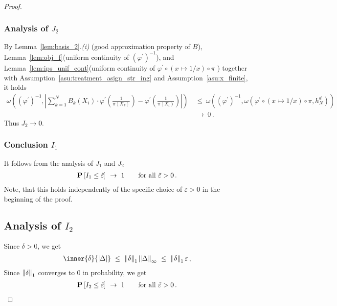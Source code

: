 \begin{proof}
\subsubsection*{Analysis of $J_2$}
By Lemma~\ref{lem:basis_2}.\textit{(i)}
(good approximation property of $B$),
Lemma~\ref{lem:obj_f}(uniform continuity of $(\varphi^{'})^{-1}$),
and
Lemma~\ref{lem:ips_unif_cont}(uniform continuity of 
$
\varphi^{'}\circ(x\mapsto1/x)\circ \pi
$
) 
together with 
Assumption~\eqref{asu:treatment_asign_str_ing} and Assumption~\ref{asu:x_finite},
it holds
\begin{align*}
\omega
\left(
  (
  \varphi^{'}
  )
  ^{-1}
  ,
  \left|
    \sum_{k=1}^{N}
  B_k(X_i)
  \cdot
  \varphi^{'}
  \left(
    \frac
    {1}
    {\pi(X_k)}
  \right)
  -
  \varphi^{'}
  \left(
    \frac
    {1}
    {\pi(X_i)}
  \right)
  \right|
  \right)
  &
  \ 
  \le
  \ 
\omega
\left(
  (
  \varphi^{'}
  )
  ^{-1}
  ,
\omega
\left(
\varphi^{'}\circ(x\mapsto1/x)\circ \pi
  ,
  h_N^d
  \right)
  \right)
  \\
  &
  \ 
  \to
  \ 
  0
  \,.
\end{align*}
Thus $J_2\to 0$.
\subsubsection*{Conclusion $I_1$}
It follows from the analysis of $J_1$ and $J_2$
\begin{align*}
  \P
  \left[
  I_1 \le \tilde{\varepsilon}
  \right]
  \ 
  \to
  \ 
  1
  \qquad
  \text{for all}\ 
  \tilde{\varepsilon}>0
  \,.
\end{align*}
Note, that this holds independently of the specific choice of $\varepsilon>0$ in the beginning of the proof.
\subsection*{Analysis of $I_2$}
Since
$\delta>0$,
we get
\begin{align*}
     \inner{\delta}
     {|\Delta|}
     \ 
     \le
     \ 
     \norm{\delta}_1
     \norm{\Delta}_\infty
     \ 
     \le
     \ 
     \norm{\delta}_1
     \varepsilon
     \,,
\end{align*}
Since $\left\lVert\delta\right\rVert_1$ converges to $0$ in probability, we get
\begin{align*}
  \P
  \left[
  I_2 \le \tilde{\varepsilon}
  \right]
  \ 
  \to
  \ 
  1
  \qquad
  \text{for all}\ 
  \tilde{\varepsilon}>0
  \,.
\end{align*}

\end{proof}
